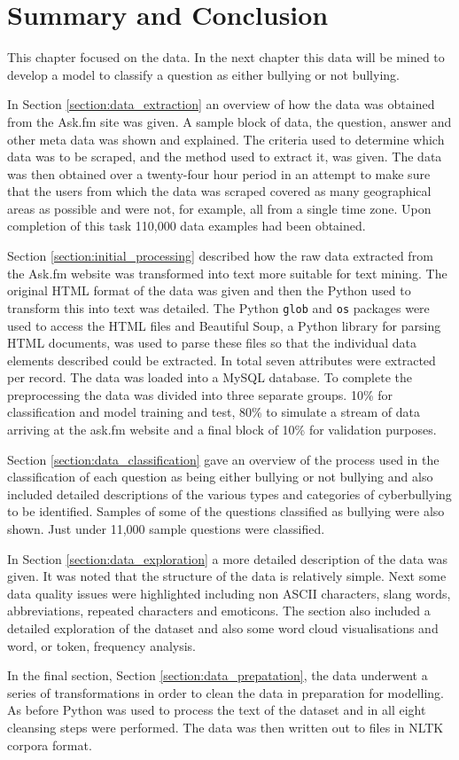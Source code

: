 \section{Summary and Conclusion}
\label{section:summary_conclusion}

This chapter focused on the data. In the next chapter this data will be mined to develop a model to classify a question as either bullying or not bullying. 

In Section \ref{section:data_extraction} an overview of how the data was obtained from the Ask.fm site was given. A sample block of data, the question, answer and other meta data was shown and explained. The criteria used to determine which data was to be scraped, and the method used to extract it, was given. The data was then obtained over a twenty-four hour period in an attempt to make sure that the users from which the data was scraped covered as many geographical areas as possible and were not, for example, all from a single time zone. Upon completion of this task 110,000 data examples had been obtained.

Section \ref{section:initial_processing} described how the raw data extracted from the Ask.fm website was transformed into text more suitable for text mining. The original HTML format of the data was given and then the Python used to transform this into text was detailed. The Python \verb|glob| and \verb|os| packages were used to access the HTML files and Beautiful Soup, a Python library for parsing HTML documents, was used to parse these files so that the individual data elements described could be extracted. In total seven attributes were extracted per record. The data was loaded into a MySQL database. To complete the preprocessing the data was divided into three separate groups.  10\% for classification and model training and test, 80\% to simulate a stream of data arriving at the ask.fm website and a final block of 10\% for validation purposes. 

Section \ref{section:data_classification} gave an overview of the process used in the classification of each question as being either bullying or not bullying and also included detailed descriptions of the various types and categories of cyberbullying to be identified. Samples of some of the questions classified as bullying were also shown. Just under 11,000 sample questions were classified.

In Section \ref{section:data_exploration} a more detailed description of the data was given. It was noted that the structure of the data is relatively simple. Next some data quality issues were highlighted including non ASCII characters, slang words, abbreviations, repeated characters and emoticons. The section also included a detailed exploration of the dataset and also some word cloud visualisations and word, or token, frequency analysis.

In the final section, Section \ref{section:data_prepatation}, the data underwent a series of transformations in order to clean the data in preparation for modelling. As before Python was used to process the text of the dataset and in all eight cleansing steps were performed. The data was then written out to  files in NLTK corpora format.

